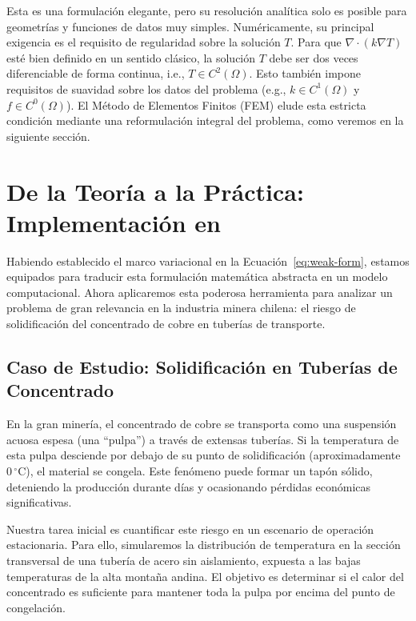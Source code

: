 Esta es una formulación elegante, pero su resolución analítica solo es posible para geometrías y funciones de datos muy simples. Numéricamente, su principal exigencia es el requisito de regularidad sobre la solución \(T\). Para que \(\nabla \cdot (k \nabla T)\) esté bien definido en un sentido clásico, la solución \(T\) debe ser dos veces diferenciable de forma continua, i.e., \(T \in C^2(\Omega)\). Esto también impone requisitos de suavidad sobre los datos del problema (e.g., \(k \in C^1(\Omega)\) y \(f \in C^0(\Omega)\)). El Método de Elementos Finitos (FEM) elude esta estricta condición mediante una reformulación integral del problema, como veremos en la siguiente sección.


\section{De la Teoría a la Práctica: Implementación en \fenics}
\label{sec:poisson-fenics}

Habiendo establecido el marco variacional en la Ecuación~\eqref{eq:weak-form}, estamos equipados para traducir esta formulación matemática abstracta en un modelo computacional. Ahora aplicaremos esta poderosa herramienta para analizar un problema de gran relevancia en la industria minera chilena: el riesgo de solidificación del concentrado de cobre en tuberías de transporte.

\subsection{Caso de Estudio: Solidificación en Tuberías de Concentrado}
En la gran minería, el concentrado de cobre se transporta como una suspensión acuosa espesa (una ``pulpa'') a través de extensas tuberías. Si la temperatura de esta pulpa desciende por debajo de su punto de solidificación (aproximadamente \(0 \, ^\circ\text{C}\)), el material se congela. Este fenómeno puede formar un tapón sólido, deteniendo la producción durante días y ocasionando pérdidas económicas significativas.

Nuestra tarea inicial es cuantificar este riesgo en un escenario de operación estacionaria. Para ello, simularemos la distribución de temperatura en la sección transversal de una tubería de acero sin aislamiento, expuesta a las bajas temperaturas de la alta montaña andina. El objetivo es determinar si el calor del concentrado es suficiente para mantener toda la pulpa por encima del punto de congelación.

